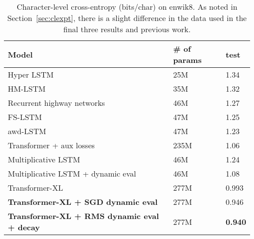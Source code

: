 \documentclass{article} \usepackage{iclr2018_conference,times}
\begin{document}
\begin{table*}[tb]
\begin{center}
\begin{adjustbox}{width=1\textwidth}
\begin{tabular}{l  l  l  } \toprule
Model & \# of params  & test   \\
\midrule
Hyper LSTM \citep{Ha2017}  & 25M & 1.34 \\
HM-LSTM \citep{chung2017}  & 35M & 1.32 \\
Recurrent highway networks \citep{zilly2017} & 46M & 1.27   \\
FS-LSTM \citep{mujika2017} & 47M & 1.25 \\
awd-LSTM \citep{merity2018} & 47M & 1.23 \\
Transformer + aux losses \citep{al2018}  & 235M & 1.06 \\
Multiplicative LSTM \citep{krause2016} & 46M & 1.24  \\
Multiplicative LSTM + dynamic eval \citep{krause2018} & 46M & 1.08 \\
\midrule
Transformer-XL \citep{dai2019} & 277M  & 0.993 \\
\textbf{Transformer-XL + SGD dynamic eval} & 277M  & 0.946   \\
\textbf{Transformer-XL + RMS dynamic eval + decay} & 277M  & \textbf{0.940}     \\
\bottomrule
\end{tabular}
\end{adjustbox}
\end{center}
\caption{Character-level cross-entropy (bits/char) on enwik8. As noted in
Section~\ref{sec:clexpt}, there is a slight difference in the data used in the
final three results and previous work.}
\label{tab:dynamic-transformer-char}
\end{table*}
\end{document}
